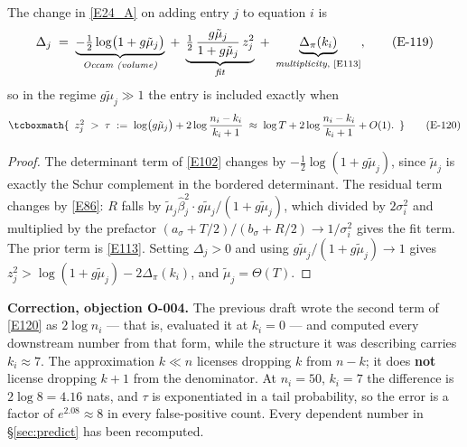 \begin{proposition}\label{prop:incl}
The change in \eqref{E24_A} on adding entry $j$ to equation $i$ is
\begin{equation}
\Delta_j \;=\; \underbrace{-\tfrac12\log\bigl(1+g\tilde\mu_j\bigr)}_{\textit{Occam (volume)}}
\;+\; \underbrace{\tfrac12\,\frac{g\tilde\mu_j}{1+g\tilde\mu_j}\,z_j^2}_{\textit{fit}}
\;+\; \underbrace{\Delta_\pi(k_i)}_{\textit{multiplicity}, \text{ \eqref{E113}}},
\tag{E-119}\label{E119}
\end{equation}
so in the regime $g\tilde\mu_j\gg1$ the entry is included exactly when
\begin{equation}
\tcboxmath{ \begin{array}[t]{c}
z_j^2 \;>\; \tau \;:=\; \log\bigl(g\tilde\mu_j\bigr) + 2\log\dfrac{n_i-k_i}{k_i+1}
\;\approx\; \log T + 2\log\dfrac{n_i-k_i}{k_i+1} + O(1).
\end{array}}
\tag{E-120}\label{E120}
\end{equation}
\end{proposition}

\begin{proof}
The determinant term of \eqref{E102} changes by $-\frac12\log(1+g\tilde\mu_j)$,
since $\tilde\mu_j$ is exactly the Schur complement in the bordered determinant. The
residual term changes by \eqref{E86}: $R$ falls by
$\tilde\mu_j\hat\beta_j^2\cdot g\tilde\mu_j/(1+g\tilde\mu_j)$, which divided by
$2\sigma_i^2$ and multiplied by the prefactor
$(a_\sigma+T/2)/(b_\sigma+R/2)\to1/\sigma_i^2$ gives the fit term. The prior term is
\eqref{E113}. Setting $\Delta_j>0$ and using $g\tilde\mu_j/(1+g\tilde\mu_j)\to1$
gives $z_j^2>\log(1+g\tilde\mu_j)-2\Delta_\pi(k_i)$, and $\tilde\mu_j=\Theta(T)$.
\end{proof}

\begin{recordbox}
\textbf{Correction, objection O-004.} The previous draft wrote the second term of
\eqref{E120} as $2\log n_i$ --- that is, evaluated it at $k_i=0$ --- and computed
every downstream number from that form, while the structure it was describing carries
$k_i\approx7$. The approximation $k\ll n$ licenses dropping $k$ from $n-k$; it does
\textbf{not} license dropping $k+1$ from the denominator. At $n_i=50$, $k_i=7$ the
difference is $2\log8=4.16$ nats, and $\tau$ is exponentiated in a tail probability,
so the error is a factor of $e^{2.08}\approx8$ in every false-positive count. Every
dependent number in \S\ref{sec:predict} has been recomputed.
\end{recordbox}

